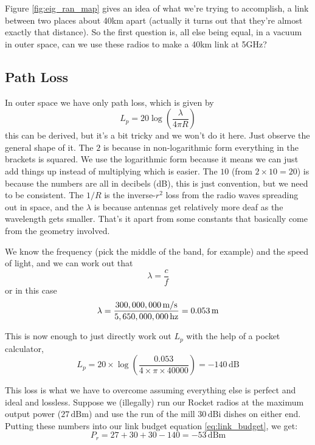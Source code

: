 Figure \ref{fig:eig_ran_map} gives an idea of what we're trying to
accomplish, a link between two places about 40km apart (actually it
turns out that they're almost exactly that distance). So the first
question is, all else being equal, in a vacuum in outer space, can we
use these radios to make a 40km link at 5GHz?

\subsection{Path Loss}
In outer space we have only path loss, which is given by
\begin{equation}
L_p = 20 \log \left(\frac{\lambda}{4 \pi R}\right)
\end{equation}
this can be derived, but it's a bit tricky and we won't do it
here. Just observe the general shape of it. The $2$ is because in
non-logarithmic form everything in the brackets is squared. We use the
logarithmic form because it means we can just add things up instead of
multiplying which is easier. The $10$ (from $2 \times 10 = 20$) is
because the numbers are all in decibels (dB), this is just convention,
but we need to be consistent. The $1/R$ is the inverse-$r^2$
loss from the radio waves spreading out in space, and the $\lambda$ is
because antennas get relatively more deaf as the wavelength gets
smaller. That's it apart from some constants that basically come from
the geometry involved.

We know the frequency (pick the middle of the band, for example) and
the speed of light, and we can work out that
\begin{equation}
\lambda = \frac{c}{f}
\end{equation}
or in this case
$$
\lambda = \frac{%
  300,000,000\, \mathrm{m}/\mathrm{s}%
}{%
  5,650,000,000\,\mathrm{hz}%
} = 0.053\, \mathrm{m}
$$

This is now enough to just directly work out $L_p$ with the help of a
pocket calculator,
$$
L_p = 20 \times \log \left( \frac{0.053}{4 \times \pi \times 40000} \right)
= -140\,\mathrm{dB}
$$

This loss is what we have to overcome assuming everything else is
perfect and ideal and lossless. Suppose we (illegally) run our Rocket
radios at the maximum output power ($27\,\mathrm{dBm}$) and use the
run of the mill $30\, \mathrm{dBi}$ dishes on either end. Putting these
numbers into our link budget equation \ref{eq:link_budget}, we get:
$$
P_r = 27 + 30 + 30 - 140 = -53\, \mathrm{dBm}
$$

